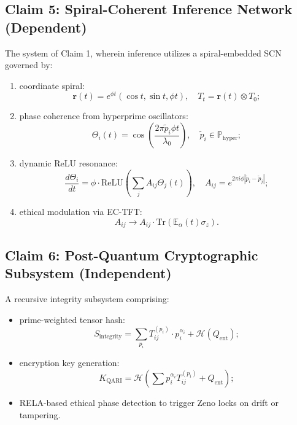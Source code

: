 \documentclass[12pt]{article}
\begin{document}
\subsection*{Claim 5: Spiral-Coherent Inference Network (Dependent)}

The system of Claim 1, wherein inference utilizes a spiral-embedded SCN governed by:

\begin{enumerate}
    \item coordinate spiral:
    \[
    \mathbf{r}(t) = e^{\phi t}(\cos t, \sin t, \phi t), \quad T_t = \mathbf{r}(t) \otimes T_0;
    \]

    \item phase coherence from hyperprime oscillators:
    \[
    \Theta_i(t) = \cos\left( \frac{2\pi \tilde{p}_i \phi t}{\lambda_0} \right), \quad \tilde{p}_i \in \mathbb{P}_{\text{hyper}};
    \]

    \item dynamic ReLU resonance:
    \[
    \frac{d\Theta_i}{dt} = \phi \cdot \text{ReLU}\left( \sum_j A_{ij} \Theta_j(t) \right), \quad A_{ij} = e^{2\pi i \phi |\tilde{p}_i - \tilde{p}_j|};
    \]

    \item ethical modulation via EC-TFT:
    \[
    A_{ij} \rightarrow A_{ij} \cdot \text{Tr}(\mathbb{E}_\alpha(t) \sigma_z).
    \]
\end{enumerate}

\subsection*{Claim 6: Post-Quantum Cryptographic Subsystem (Independent)}

A recursive integrity subsystem comprising:

\begin{itemize}
    \item prime-weighted tensor hash:
    \[
    S_{\text{integrity}} = \sum_{p_i} T^{(p_i)}_{ij} \cdot p_i^{\alpha_i} + \mathcal{H}(Q_{\text{ent}});
    \]

    \item encryption key generation:
    \[
    K_{\text{QARI}} = \mathcal{H}\left(\sum p_i^{\alpha_i} T^{(p_i)}_{ij} + Q_{\text{ent}}\right);
    \]

    \item RELA-based ethical phase detection to trigger Zeno locks on drift or tampering.
\end{itemize}
\end{document}
